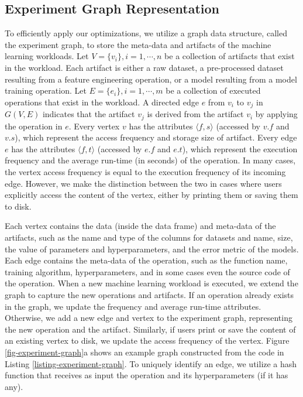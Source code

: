 \subsection{Experiment Graph Representation}\label{sub-graph-construction}
To efficiently apply our optimizations, we utilize a graph data structure, called the experiment graph, to store the meta-data and artifacts of the machine learning workloads.
Let $V=\{v_i\}, i = 1, \cdots, n$ be a collection of artifacts that exist in the workload.
Each artifact is either a raw dataset, a pre-processed dataset resulting from a feature engineering operation, or a model resulting from a model training operation.
Let $E=\{e_i\}, i = 1, \cdots, m$ be a collection of executed operations that exist in the workload.
A directed edge $e$ from $v_i$ to $v_j$ in $G(V,E)$ indicates that the artifact $v_j$ is derived from the artifact $v_i$ by applying the operation in $e$.
Every vertex $v$ has the attributes $\langle f, s \rangle$ (accessed by $v.f$ and $v.s$), which represent the access frequency and storage size of artifact.
Every edge $e$ has the attributes $\langle f, t \rangle$ (accessed by $e.f$ and $e.t$), which represent the execution frequency and the average run-time (in seconds) of the operation.
In many cases, the vertex access frequency is equal to the execution frequency of its incoming edge.
However, we make the distinction between the two in cases where users explicitly access the content of the vertex, either by printing them or saving them to disk.

Each vertex contains the data (inside the data frame) and meta-data of the artifacts, such as the name and type of the columns for datasets and name, size, the value of parameters and hyperparameters, and the error metric of the models.
Each edge contains the meta-data of the operation, such as the function name, training algorithm, hyperparameters, and in some cases even the source code of the operation.
When a new machine learning workload is executed, we extend the graph to capture the new operations and artifacts.
If an operation already exists in the graph, we update the frequency and average run-time attributes.
Otherwise, we add a new edge and vertex to the experiment graph, representing the new operation and the artifact.
Similarly, if users print or save the content of an existing vertex to disk, we update the access frequency of the vertex.
Figure \ref{fig-experiment-graph}a shows an example graph constructed from the code in Listing \ref{listing-experiment-graph}.
To uniquely identify an edge, we utilize a hash function that receives as input the operation and its hyperparameters (if it has any).

